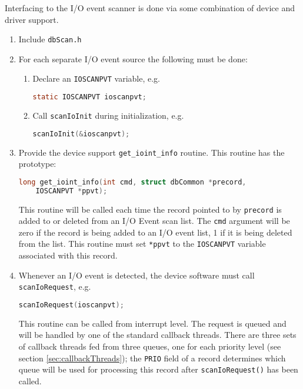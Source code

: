 
Interfacing to the I/O event scanner is done via some combination of device and driver support.

\begin{enumerate}
\item Include \verb|dbScan.h|

\item For each separate I/O event source the following must be done:

\begin{enumerate}

\item Declare an \verb|IOSCANPVT| variable, e.g.

\begin{lstlisting}[language=C]
static IOSCANPVT ioscanpvt;
\end{lstlisting}

\item Call \verb|scanIoInit| during initialization, e.g.

\begin{lstlisting}[language=C]
scanIoInit(&ioscanpvt);
\end{lstlisting}
\end{enumerate}

\item Provide the device support \verb|get_ioint_info| routine.
This routine has the prototype:

\begin{lstlisting}[language=C]
long get_ioint_info(int cmd, struct dbCommon *precord,
    IOSCANPVT *ppvt);
\end{lstlisting}

This routine will be called each time the record pointed to by \verb|precord| is added to or deleted from an I/O Event scan list.
The \verb|cmd| argument will be zero if the record is being added to an I/O event list, 1 if it is being deleted from the list.
This routine must set \verb|*ppvt| to the \verb|IOSCANPVT| variable associated with this record.

\item Whenever an I/O event is detected, the device software must call \verb|scanIoRequest|, e.g.

\begin{lstlisting}[language=C]
scanIoRequest(ioscanpvt);
\end{lstlisting}

This routine can be called from interrupt level.
The request is queued and will be handled by one of the standard callback threads.
There are three sets of callback threads fed from three queues, one for each priority level (see section \ref{sec:callbackThreads}); the \verb|PRIO| field of a record determines which queue will be used for processing this record after \verb|scanIoRequest()| has been called.


\end{enumerate}
